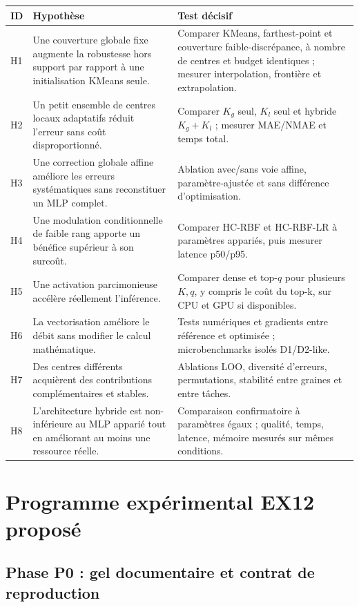 \documentclass[11pt,a4paper]{article}
\begin{document}
\begin{longtable}{P{1.25cm}P{4.1cm}P{8.4cm}}
\toprule
\textbf{ID} & \textbf{Hypothèse} & \textbf{Test décisif}\\
\midrule
H1 & Une couverture globale fixe augmente la robustesse hors support par rapport à une initialisation KMeans seule. & Comparer KMeans, farthest-point et couverture faible-discrépance, à nombre de centres et budget identiques ; mesurer interpolation, frontière et extrapolation.\\
H2 & Un petit ensemble de centres locaux adaptatifs réduit l'erreur sans coût disproportionné. & Comparer $K_g$ seul, $K_l$ seul et hybride $K_g+K_l$ ; mesurer MAE/NMAE et temps total.\\
H3 & Une correction globale affine améliore les erreurs systématiques sans reconstituer un MLP complet. & Ablation avec/sans voie affine, paramètre-ajustée et sans différence d'optimisation.\\
H4 & Une modulation conditionnelle de faible rang apporte un bénéfice supérieur à son surcoût. & Comparer HC-RBF et HC-RBF-LR à paramètres appariés, puis mesurer latence p50/p95.\\
H5 & Une activation parcimonieuse accélère réellement l'inférence. & Comparer dense et top-$q$ pour plusieurs $K,q$, y compris le coût du top-k, sur CPU et GPU si disponibles.\\
H6 & La vectorisation améliore le débit sans modifier le calcul mathématique. & Tests numériques et gradients entre référence et optimisée ; microbenchmarks isolés D1/D2-like.\\
H7 & Des centres différents acquièrent des contributions complémentaires et stables. & Ablations LOO, diversité d'erreurs, permutations, stabilité entre graines et entre tâches.\\
H8 & L'architecture hybride est non-inférieure au MLP apparié tout en améliorant au moins une ressource réelle. & Comparaison confirmatoire à paramètres égaux ; qualité, temps, latence, mémoire mesurés sur mêmes conditions.\\
\bottomrule
\end{longtable}

\section{Programme expérimental EX12 proposé}

\subsection{Phase P0 : gel documentaire et contrat de reproduction}
\end{document}

